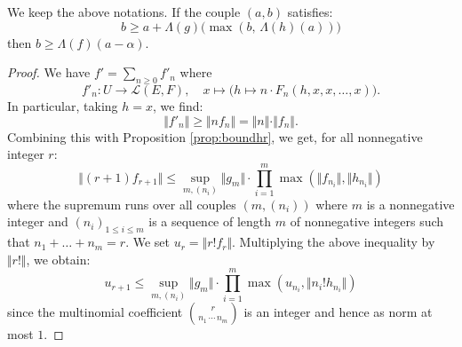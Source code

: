 \documentclass{sig-alternate}
\begin{document}
\begin{lem}
\label{lem:boundLambdaf}
We keep the above notations. If the couple $(a,b)$ satisfies:
\begin{equation}
\label{eq:condAB}
b \geq a + \Lambda(g)\big( \! \max(b, \, \Lambda(h) (a)) \big)
\end{equation}
then $b \geq \Lambda(f)(a - \alpha)$.
\end{lem}

\begin{proof}
We have $f' = \sum_{n \geq 0} f'_n$ where
$$f'_n : U \to \mathcal L(E,F), \quad
x \mapsto \big(h \mapsto n \cdot F_n(h, x, x, \ldots, x)\big).$$
In particular, taking $h = x$, we find:
\begin{equation}
\label{eq:normderivative}
\Vert f'_n \Vert \geq \Vert n f_n \Vert = 
\Vert n \Vert \cdot \Vert f_n \Vert.
\end{equation}
Combining this with Proposition \ref{prop:boundhr}, we get, for all
nonnegative integer $r$:
$$\Vert (r+1) f_{r+1} \Vert \leq
  \sup_{m, (n_i)} \Vert g_m \Vert \cdot 
  \prod_{i=1}^m \max(\Vert f_{n_i} \Vert, \Vert h_{n_i} \Vert)$$
where the supremum runs over all couples $(m, (n_i))$ where $m$
is a nonnegative integer and $(n_i)_{1 \leq i \leq m}$ is a sequence of
length $m$ of nonnegative integers such that $n_1 + \ldots + n_m = r$.
We set $u_r = \Vert r! f_r \Vert$. Multiplying the above inequality by
$\Vert r! \Vert$, we obtain:
\begin{equation}
\label{eq:boundurrec}
u_{r+1} \leq
  \sup_{m, (n_i)} \Vert g_m \Vert \cdot 
  \prod_{i=1}^m \max(u_{n_i}, \Vert n_i! h_{n_i} \Vert)
\end{equation}
since the multinomial coefficient $\binom r {\!n_1 \, \cdots \, n_m\!}$
is an integer and hence as norm at most $1$.


\end{proof}
\end{document}
